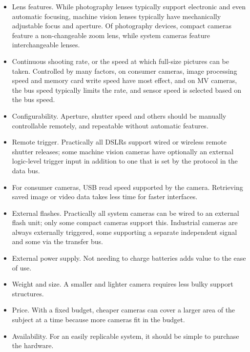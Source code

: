 \begin{itemize}
	\item Lens features. While photography lenses typically support electronic and even automatic focusing, machine vision lenses typically have mechanically adjustable focus and aperture. Of photography devices, compact cameras feature a non-changeable zoom lens, while system cameras feature interchangeable lenses.

	\item Continuous shooting rate, or the speed at which full-size pictures can be taken. Controlled by many factors, on consumer cameras, image processing speed and memory card write speed have most effect, and on MV cameras, the bus speed typically limits the rate, and sensor speed is selected based on the bus speed.

	\item Configurability. Aperture, shutter speed and others should be manually controllable remotely, and repeatable without automatic features.

	\item Remote trigger. Practically all DSLRs support wired or wireless remote shutter releases; some machine vision cameras have optionally an external logic-level trigger input in addition to one that is set by the protocol in the data bus. %

	\item For consumer cameras, USB read speed supported by the camera. Retrieving saved image or video data takes less time for faster interfaces.

	\item External flashes. Practically all system cameras can be wired to an external flash unit; only some compact cameras support this. Industrial cameras are always externally triggered, some supporting a separate independent signal and some via the transfer bus.

	\item External power supply. Not needing to charge batteries adds value to the ease of use.

	\item Weight and size. A smaller and lighter camera requires less bulky support structures.

	\item Price. With a fixed budget, cheaper cameras can cover a larger area of the subject at a time because more cameras fit in the budget.

	\item Availability. For an easily replicable system, it should be simple to purchase the hardware.
\end{itemize}

